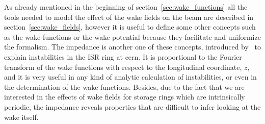     As already mentioned in the beginning of section~\ref{sec:wake_functions} all the tools needed to model the effect of the wake fields on the beam are described in section~\ref{sec:wake_fields}, however it is useful to define some other concepts such as the wake functions or the wake potential because they facilitate and uniformize the formalism. The impedance is another one of these concepts, introduced by~ to explain instabilities in the ISR ring at \gls{cern}. It is proportional to the Fourier transform of the wake functions with respect to the longitudinal coordinate, $z$, and it is very useful in any kind of analytic calculation of instabilities, or even in the determination of the wake functions. Besides, due to the fact that we are interested in the effects of wake fields for storage rings which are intrinsically periodic, the impedance reveals properties that are difficult to infer looking at the wake itself.

